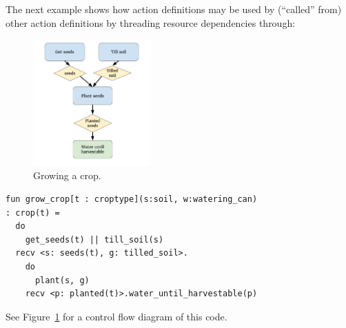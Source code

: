 The next example shows how action definitions may be used by (``called'' from) other
action definitions by threading resource dependencies through:

\begin{figure}
  \includegraphics[width=0.4\textwidth]{sdv-grow-crop.png}
  \caption{Growing a crop.}
  \label{fig:grow}
\end{figure}

\begin{verbatim}
fun grow_crop[t : croptype](s:soil, w:watering_can)
: crop(t) =
  do
    get_seeds(t) || till_soil(s)
  recv <s: seeds(t), g: tilled_soil>.
    do
      plant(s, g)
    recv <p: planted(t)>.water_until_harvestable(p)
\end{verbatim}
See Figure~\ref{fig:grow} for a control flow diagram of this code.

 
% 
% 

